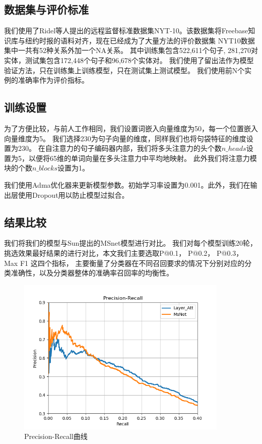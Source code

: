 \documentclass[UTF8]{csoarticle}
\begin{document}
\subsection{数据集与评价标准}
我们使用了Ridel\cite{bib2}等人提出的远程监督标准数据集NYT-10。该数据集将Freebase知识库与纽约时报的语料对齐，现在已经成为了大量方法的评价数据集
NYT10数据集中一共有52种关系外加一个NA关系。
其中训练集包含522,611个句子, 281,270对实体，测试集包含172,448个句子和96,678个实体对。
我们使用了留出法作为模型验证方法，只在训练集上训练模型，只在测试集上测试模型。
我们使用前N个实例的准确率作为评价指标。

\subsection{训练设置}
为了方便比较，与前人工作\cite{bib3, bib4}相同，我们设置词嵌入向量维度为50，每一个位置嵌入向量维度为5。
我们选择230为句子向量的维度，同样我们也将句袋特征的维度设置为230。
在自注意力的句子编码器内部，我们将多头注意力的头个数$n\_heads$设置为5，以便将65维的单词向量在多头注意力中平均地映射。
此外我们将注意力模块的个数$n\_blocks$设置为1。

我们使用Adma优化器来更新模型参数。初始学习率设置为0.001。此外，我们在输出层使用Dropout用以防止模型过拟合。
\subsection{结果比较}
我们将我们的模型与Sun\cite{bib12}提出的MSnet模型进行对比。
我们对每个模型训练20轮，挑选效果最好结果的进行对比，本文我们主要选取P@0.1， P@0.2， P@0.3， Max F1 这四个指标，
主要衡量了分类器在不同召回要求的情况下分别对应的分类准确性，以及分类器整体的准确率召回率的均衡性。

\begin{figure}[ht]
\centering
\includegraphics[width=0.9\textwidth]{pr_curve.png} 
\caption{Precision-Recall曲线}
\label{fig1}
\end{figure}
\end{document}
